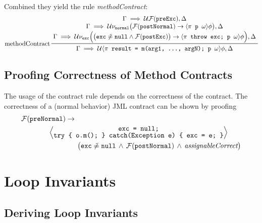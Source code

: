			Combined they yield the rule \textit{methodContract}:
			\begin{equation*}
				\prftree[l]
					{methodContract}
					{\let\scriptstyle\textstyle \substack{
					 \Gamma \implies \mathcal{U} \mathcal{F}(\texttt{preExc}), \Delta \\
					 \Gamma \implies \mathcal{U} \nu_\texttt{normal} \big( \mathcal{F}(\texttt{postNormal}) \to \langle \pi \texttt{ p } \omega \rangle \phi \big), \Delta \\
					 \Gamma \implies \mathcal{U} \nu_\texttt{exc} \Big( \big( \texttt{exc} \not\doteq \texttt{null} \land \mathcal{F}(\texttt{postExc}) \big) \to \langle \pi \texttt{ throw exc; p } \omega \rangle \phi \Big), \Delta}}
					{\Gamma \implies \mathcal{U} \langle \pi \texttt{ result = m(arg1, ..., argN); p } \omega \rangle \phi, \Delta}
			\end{equation*}

		\subsection{Proofing Correctness of Method Contracts}
			The usage of the contract rule depends on the correctness of the contract. The correctness of a (normal behavior) JML contract can be shown by proofing
			\begin{align*}
				&\mathcal{F}(\texttt{preNormal}) \to \\
				&\qquad\qquad \Big\langle { \let\scriptstyle\textstyle \substack{\texttt{exc = null;} \\ \texttt{try \{ o.m(); \} catch(Exception e) \{ exc = e; \}}} } \Big\rangle \\
				&\qquad\qquad\qquad\qquad \big( \texttt{exc} \not\doteq \texttt{null} \,\land\, \mathcal{F}(\texttt{postNormal}) \,\land\, \textit{assignableCorrect} \big)
			\end{align*}

	\section{Loop Invariants} %
		\label{sec:dlLoopInv}
	

		\subsection{Deriving Loop Invariants} %

